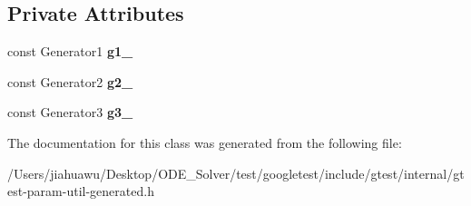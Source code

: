 \subsection*{Private Attributes}
\begin{DoxyCompactItemize}
\item 
\mbox{\label{classtesting_1_1internal_1_1_cartesian_product_holder3_a35cd85b4bf7a73e4fbea38226479898f}} 
const Generator1 {\bfseries g1\+\_\+}
\item 
\mbox{\label{classtesting_1_1internal_1_1_cartesian_product_holder3_ac96127870d5a27053886931468ee20c7}} 
const Generator2 {\bfseries g2\+\_\+}
\item 
\mbox{\label{classtesting_1_1internal_1_1_cartesian_product_holder3_a5ac21826f78dc70ba258cfc08023402c}} 
const Generator3 {\bfseries g3\+\_\+}
\end{DoxyCompactItemize}


The documentation for this class was generated from the following file\+:\begin{DoxyCompactItemize}
\item 
/\+Users/jiahuawu/\+Desktop/\+O\+D\+E\+\_\+\+Solver/test/googletest/include/gtest/internal/gtest-\/param-\/util-\/generated.\+h\end{DoxyCompactItemize}

